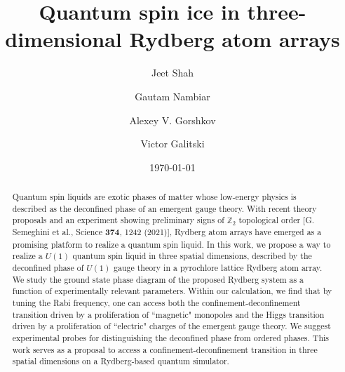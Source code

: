 \documentclass[twocolumn,superscriptaddress,amsmath,amssymb,aps,prx,nofootinbib]{revtex4-2}
\begin{document}
\title{Quantum spin ice in three-dimensional Rydberg atom arrays}

\author{Jeet Shah}
\author{Gautam Nambiar}
\author{Alexey V. Gorshkov}
\author{Victor Galitski}
\date{\today}


\begin{abstract}

  Quantum spin liquids are exotic phases of matter whose low-energy physics is described as the deconfined phase of an emergent gauge theory. With recent theory proposals and an experiment showing preliminary signs of $\mathbb{Z}_2$ topological order [G. Semeghini et al., Science \textbf{374}, 1242 (2021)], Rydberg atom arrays have emerged as a promising platform to realize a quantum spin liquid. In this work, we propose a way to realize a $U(1)$ quantum spin liquid in three spatial dimensions, described by the deconfined phase of $U(1)$ gauge theory in a pyrochlore lattice Rydberg atom array. We study the ground state phase diagram of the proposed Rydberg system as a function of experimentally relevant parameters. Within our calculation, we find that by tuning the Rabi frequency, one can access both the confinement-deconfinement transition driven by a proliferation of ``magnetic" monopoles and the Higgs transition driven by a proliferation of ``electric" charges of the emergent gauge theory. We suggest experimental probes for distinguishing the deconfined phase from ordered phases. This work serves as a proposal to access a confinement-deconfinement transition in three spatial dimensions on a Rydberg-based quantum simulator. 
  
\end{abstract}

\maketitle
\end{document}
